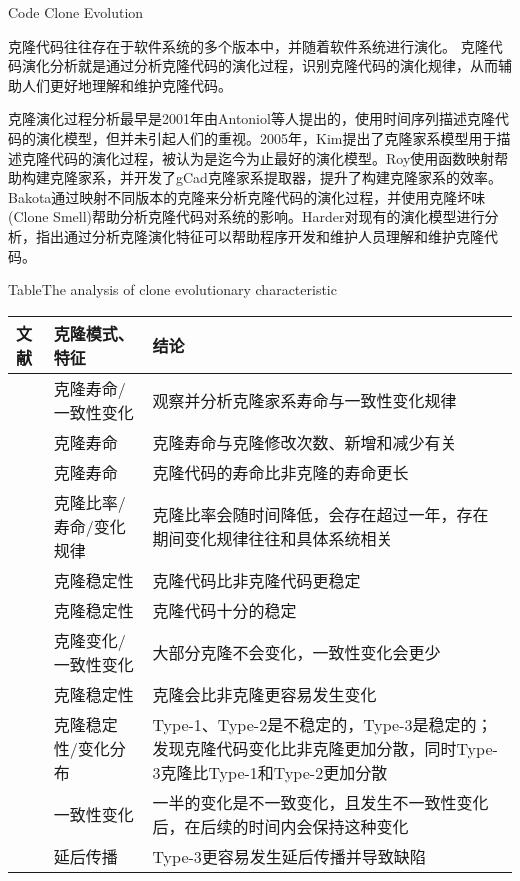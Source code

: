 {Code Clone Evolution}
\label{ref-evolution}

克隆代码往往存在于软件系统的多个版本中，并随着软件系统进行演化。
克隆代码演化分析就是通过分析克隆代码的演化过程，识别克隆代码的演化规律，从而辅助人们更好地理解和维护克隆代码。

克隆演化过程分析最早是2001年由Antoniol等人提出的，使用时间序列描述克隆代码的演化模型\cite{antoniol2001modeling}，但并未引起人们的重视。2005年，Kim提出了克隆家系模型用于描述克隆代码的演化过程，被认为是迄今为止最好的演化模型\cite{kim2005empirical}。Roy使用函数映射帮助构建克隆家系，并开发了gCad克隆家系提取器，提升了构建克隆家系的效率\cite{saha2011automatic}。Bakota通过映射不同版本的克隆来分析克隆代码的演化过程，并使用克隆坏味(Clone Smell)帮助分析克隆代码对系统的影响\cite{bakota2011tracking}。Harder对现有的演化模型进行分析\cite{harder2009modeling}，指出通过分析克隆演化特征可以帮助程序开发和维护人员理解和维护克隆代码。

\begin{table}[htbp]
\centering
{}
{Table$\!$}{The analysis of clone evolutionary characteristic}
\vspace{0.5em}
\wuhao
\begin{tabularx}{0.9\textwidth}{llX}
\toprule[1.5pt]
文献&克隆模式、特征&结论\\
\midrule[1pt]
\cite{kim2005empirical}&	克隆寿命/一致性变化	&观察并分析克隆家系寿命与一致性变化规律\\
\cite{cai2011empirical}&	克隆寿命&	克隆寿命与克隆修改次数、新增和减少有关\\
\cite{krinke2011cloned}&	克隆寿命&	克隆代码的寿命比非克隆的寿命更长\\
\cite{bazrafshan2012evolution}\cite{gode2009evolution}&	克隆比率/寿命/变化规律	&克隆比率会随时间降低，会存在超过一年，存在期间变化规律往往和具体系统相关\\
\hline
\cite{krinke2008cloned}&克隆稳定性&	克隆代码比非克隆代码更稳定\\
\cite{gode2011clone}\cite{harder2013cloned}&	克隆稳定性&	克隆代码十分的稳定\\
\cite{gode2011frequency}&	克隆变化/一致性变化&	大部分克隆不会变化，一致性变化会更少\\
\cite{rahman2014change}&	克隆稳定性&	克隆会比非克隆更容易发生变化\\
\cite{mondal2012comparative}\cite{mondal2012dispersion}&	克隆稳定性/变化分布&	Type-1、Type-2是不稳定的，Type-3是稳定的；发现克隆代码变化比非克隆更加分散，同时Type-3克隆比Type-1和Type-2更加分散\\
\hline
\cite{krinke2007study}&	一致性变化&	一半的变化是不一致变化，且发生不一致性变化后，在后续的时间内会保持这种变化\\
\cite{mondal2016comparative}&	延后传播&	Type-3更容易发生延后传播并导致缺陷\\
\bottomrule[1.5pt]
\end{tabularx}
\end{table}

